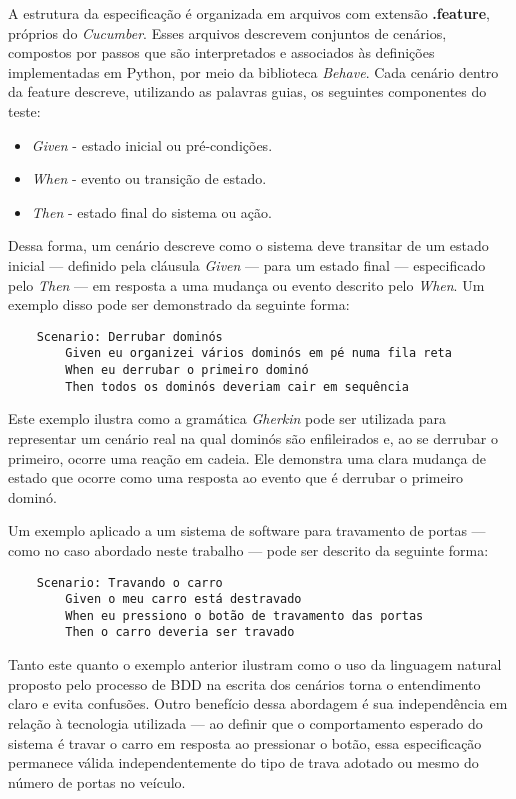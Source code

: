 A estrutura da especificação é organizada em arquivos com extensão \textbf{.feature}, próprios do \textit{Cucumber}. Esses arquivos descrevem conjuntos de cenários, compostos por 
passos que são interpretados e associados às definições implementadas em Python, por meio da biblioteca \textit{Behave}. Cada cenário dentro da feature descreve, utilizando 
as palavras guias, os seguintes componentes do teste:

\begin{itemize}
   	\item \textit{Given} - estado inicial ou pré-condições.
   	\item \textit{When} - evento ou transição de estado.
   	\item \textit{Then} - estado final do sistema ou ação.
\end{itemize}

Dessa forma, um cenário descreve como o sistema deve transitar de um estado inicial — definido pela cláusula \textit{Given} — para um estado final — especificado pelo 
\textit{Then} — em resposta a uma mudança ou evento descrito pelo \textit{When}. Um exemplo disso pode ser demonstrado da seguinte forma:

\begin{verbatim}
	Scenario: Derrubar dominós
		Given eu organizei vários dominós em pé numa fila reta
		When eu derrubar o primeiro dominó
		Then todos os dominós deveriam cair em sequência 
\end{verbatim}

Este exemplo ilustra como a gramática \textit{Gherkin} pode ser utilizada para representar um cenário real na qual dominós são enfileirados e, ao se derrubar o primeiro, 
ocorre uma reação em cadeia. Ele demonstra uma clara mudança de estado que ocorre como uma resposta ao evento que é derrubar o primeiro dominó.

Um exemplo aplicado a um sistema de software para travamento de portas — como no caso abordado neste trabalho — pode ser descrito da seguinte forma:

\begin{verbatim}
	Scenario: Travando o carro
		Given o meu carro está destravado
		When eu pressiono o botão de travamento das portas
		Then o carro deveria ser travado
\end{verbatim}

Tanto este quanto o exemplo anterior ilustram como o uso da linguagem natural proposto pelo processo de BDD na escrita dos cenários torna o entendimento claro 
e evita confusões. Outro benefício dessa abordagem é sua independência em relação à tecnologia utilizada — ao definir que o comportamento esperado do sistema é 
travar o carro em resposta ao pressionar o botão, essa especificação permanece válida independentemente do tipo de trava adotado ou mesmo do número de portas no veículo.

